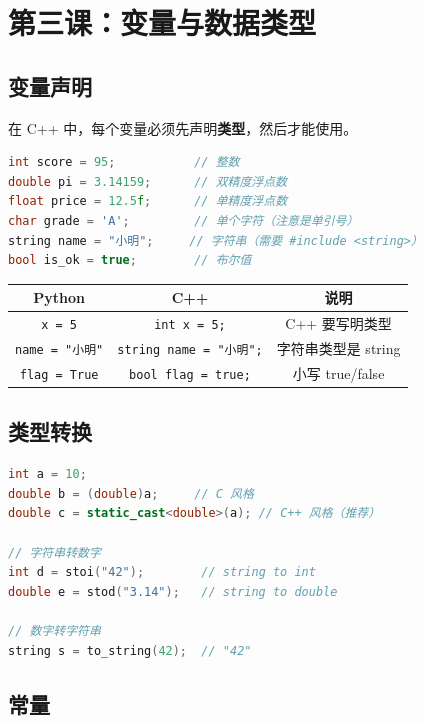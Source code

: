 \documentclass[a4paper,12pt]{ctexart}
\begin{document}
\section*{第三课：变量与数据类型}

\subsection*{变量声明}

在 C++ 中，每个变量必须先声明\textbf{类型}，然后才能使用。

\begin{lstlisting}[language=C++]
int score = 95;           // 整数
double pi = 3.14159;      // 双精度浮点数
float price = 12.5f;      // 单精度浮点数
char grade = 'A';         // 单个字符（注意是单引号）
string name = "小明";     // 字符串（需要 #include <string>）
bool is_ok = true;        // 布尔值
\end{lstlisting}

\begin{center}
\begin{tabular}{|c|c|c|}
\hline
\textbf{Python} & \textbf{C++} & \textbf{说明} \\ \hline
\texttt{x = 5} & \texttt{int x = 5;} & C++ 要写明类型 \\ \hline
\texttt{name = "小明"} & \texttt{string name = "小明";} & 字符串类型是 string \\ \hline
\texttt{flag = True} & \texttt{bool flag = true;} & 小写 true/false \\ \hline
\end{tabular}
\end{center}

\subsection*{类型转换}

\begin{lstlisting}[language=C++]
int a = 10;
double b = (double)a;     // C 风格
double c = static_cast<double>(a); // C++ 风格（推荐）

// 字符串转数字
int d = stoi("42");        // string to int
double e = stod("3.14");   // string to double

// 数字转字符串
string s = to_string(42);  // "42"
\end{lstlisting}

\subsection*{常量}
\end{document}
